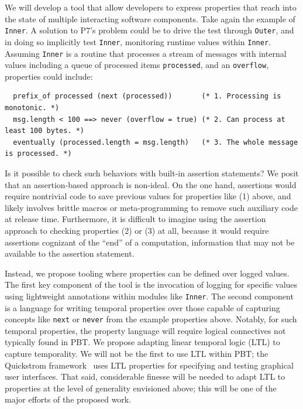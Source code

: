 We will develop a tool that allow developers to express properties that reach
into the state of multiple interacting software components. Take again the
example of \lstinline{Inner}. A solution to P7's problem could be to drive the
test through \lstinline{Outer}, and in doing so implicitly test
\lstinline{Inner}, monitoring runtime values within \lstinline{Inner}. Assuming
\lstinline{Inner} is a routine that processes a stream of messages with internal
values including a queue of processed items \lstinline{processed}, and an
\lstinline{overflow}, properties could include:

\begin{lstlisting}
  prefix_of processed (next (processed))       (* 1. Processing is monotonic. *)
  msg.length < 100 ==> never (overflow = true) (* 2. Can process at least 100 bytes. *)
  eventually (processed.length = msg.length)   (* 3. The whole message is processed. *)
\end{lstlisting}

Is it possible to check such behaviors with built-in assertion statements? We
posit that an assertion-based approach is non-ideal. On the one hand, assertions
would require nontrivial code to save previous values for properties like (1)
above, and likely involves brittle macros or meta-programming to remove such
auxiliary code at release time. Furthermore, it is difficult to imagine using
the assertion approach to checking properties (2) or (3) at all, because it
would require assertions cognizant of the ``end'' of a computation, information
that may not be available to the assertion statement.

Instead, we propose tooling where properties can be defined over logged values.
The first key component of the tool is the invocation of
logging for specific values using lightweight annotations within modules like
\lstinline{Inner}. The second component is a language for writing temporal
properties over those capable of capturing concepts like \lstinline{next} or
\lstinline{never} from the example properties above. Notably, for such temporal
properties, the property language will require logical connectives not typically
found in PBT. We propose adapting linear temporal logic (LTL) to capture
temporality. We will not be the first to use LTL within PBT; the Quickstrom
framework~\cite{oconnor_quickstrom_2022} uses LTL properties
for specifying and testing graphical user interfaces. That said, considerable
finesse will be needed to adapt LTL to properties at the level of generality
envisioned above; this will be one of the major efforts of the proposed work.


